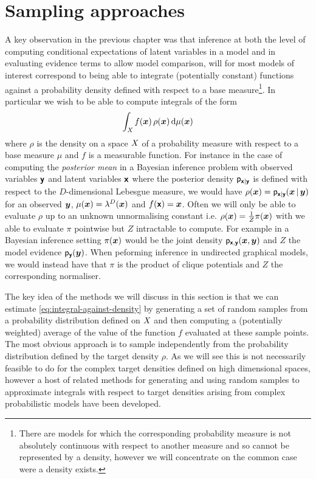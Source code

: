 \section{Sampling approaches}

A key observation in the previous chapter was that inference at both the level of computing conditional expectations of latent variables in a model and in evaluating evidence terms to allow model comparison, will for most models of interest correspond to being able to integrate (potentially constant) functions against a probability density defined with respect to a base measure\footnote{There are models for which the corresponding probability measure is not absolutely continuous with respect to another measure and so cannot be represented by a density, however we will concentrate on the common case were a density exists.}. In particular we wish to be able to compute integrals of the form
\begin{equation}\label{eq:integral-against-density}
  \int_{\mathit{X}} f(\boldsymbol{x}) \, \rho(\boldsymbol{x}) \,\mathrm{d}\mu(\boldsymbol{x})
\end{equation}
where $\rho$ is the density on a space $\mathit{X}$ of a probability measure with respect to a base measure $\mu$ and $f$ is a measurable function. For instance in the case of computing the \emph{posterior mean} in a Bayesian inference problem with observed variables $\boldsymbol{\mathsf{y}}$ and latent variables $\boldsymbol{\mathsf{x}}$ where the posterior density $\mathsf{p}_{\boldsymbol{\mathsf{x}}|\boldsymbol{\mathsf{y}}}$ is defined with respect to the $D$-dimensional Lebesgue measure, we would have  $\rho(\boldsymbol{x}) = \mathsf{p}_{\boldsymbol{\mathsf{x}}|\boldsymbol{\mathsf{y}}}(\boldsymbol{x}\operatorname{|}\boldsymbol{y})$ for an observed $\boldsymbol{y}$, $\mu(\vct{x}) = \lebm{D}(\vct{x})$ and $f(\boldsymbol{\mathsf{x}}) = \boldsymbol{x}$. Often we will only be able to evaluate $\rho$ up to an unknown unnormalising constant i.e. $\rho(\boldsymbol{x}) = \frac{1}{Z}\pi(\boldsymbol{x})$ with we able to evaluate $\pi$ pointwise but $Z$ intractable to compute. For example in a Bayesian inference setting $\pi(\boldsymbol{x})$ would be the joint density $\mathsf{p}_{\boldsymbol{\mathsf{x}},\boldsymbol{\mathsf{y}}}(\boldsymbol{x},\boldsymbol{y})$ and $Z$ the model evidence $\mathsf{p}_{\boldsymbol{\mathsf{y}}}(\boldsymbol{y})$. When peforming inference in undirected graphical models, we would instead have that $\pi$ is the product of clique potentials and $Z$ the corresponding normaliser.

The key idea of the methods we will discuss in this section is that we can estimate \eqref{eq:integral-against-density} by generating a set of random samples from a probability distribution defined on $\mathit{X}$ and then computing a (potentially weighted) average of the value of the function $f$ evaluated at these sample points. The most obvious approach is to sample independently from the probability distribution defined by the target density $\rho$. As we will see this is not necessarily feasible to do for the complex target densities defined on high dimensional spaces, however a host of related methods for generating and using random samples to approximate integrals with respect to target densities arising from complex probabilistic models have been developed.


